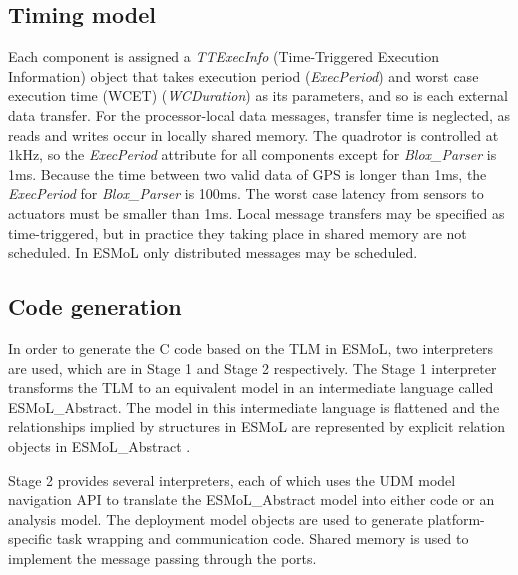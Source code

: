\documentclass{acm_proc_article-sp}
\begin{document}
\subsection{Timing model}



Each component is assigned a \emph{TTExecInfo} (Time-Triggered Execution Information) object that takes execution period (\emph{ExecPeriod}) and worst case execution time (WCET) (\emph{WCDuration}) as its parameters, and so is each external data transfer. For the processor-local data messages, transfer time is neglected, as reads and writes occur in locally shared memory. The quadrotor is controlled at 1kHz, so the \emph{ExecPeriod} attribute for all components except for \emph{Blox\_Parser} is 1ms. Because the time between two valid data of GPS is longer than 1ms, the \emph{ExecPeriod} for \emph{Blox\_Parser} is 100ms. The worst case latency from sensors to actuators must be smaller than 1ms. Local message transfers may be specified as time-triggered, but in practice they taking place in shared memory are not scheduled. In ESMoL only distributed messages may be scheduled.
 

\subsection{Code generation}

In order to generate the C code based on the TLM in ESMoL, two interpreters are used, which are in Stage 1 and Stage 2 respectively. The Stage 1 interpreter transforms the TLM to an equivalent model in an intermediate language called ESMoL\_Abstract. The model in this intermediate language is flattened and the relationships implied by structures in ESMoL are represented by explicit relation objects in ESMoL\_Abstract \cite{modeling:esmol}.

Stage 2 provides several interpreters, each of which uses the UDM model navigation API to translate the ESMoL\_Abstract model into either code or an analysis model. The deployment model objects are used to generate platform-specific task wrapping and communication code. Shared memory is used to implement the message passing through the ports.
\end{document}

